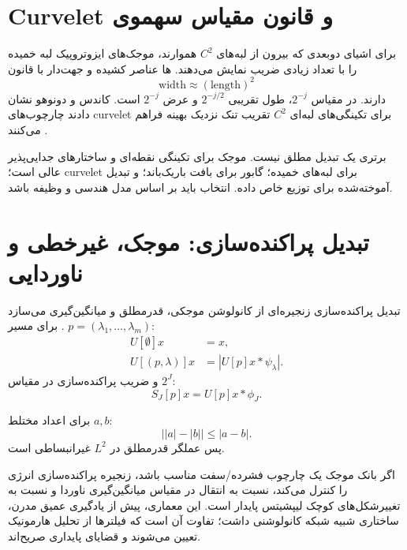\section{Curvelet و قانون مقیاس سهموی}

برای اشیای دوبعدی که بیرون از لبه‌های \(C^2\) هموارند، موجک‌های ایزوتروپیک لبه خمیده را با تعداد زیادی
ضریب نمایش می‌دهند. ها عناصر کشیده و جهت‌دار با قانون
\begin{equation}
\text{width}\approx(\text{length})^2
\end{equation}
دارند. در مقیاس \(2^{-j}\)، طول تقریبی \(2^{-j/2}\) و عرض \(2^{-j}\) است. کاندس و دونوهو نشان دادند
چارچوب‌های curvelet برای تکینگی‌های لبه‌ای \(C^2\) تقریب تنک نزدیک بهینه فراهم می‌کنند
\cite{candes2004curvelet}.

\begin{remark}
برتری یک تبدیل مطلق نیست. موجک برای تکینگی نقطه‌ای و ساختارهای جدایی‌پذیر عالی است؛ curvelet برای
لبه‌های خمیده؛ گابور برای بافت باریک‌باند؛ و تبدیل آموخته‌شده برای توزیع خاص داده. انتخاب باید بر اساس
مدل هندسی و وظیفه باشد.
\end{remark}

\section{تبدیل پراکنده‌سازی: موجک، غیرخطی و ناوردایی}

تبدیل پراکنده‌سازی  زنجیره‌ای از کانولوشن موجکی، قدرمطلق و میانگین‌گیری می‌سازد
\cite{mallat2012scattering}. برای مسیر \(p=(\lambda_1,\dots,\lambda_m)\):
\begin{equation}
\begin{aligned}
U[\emptyset]x&=x,\\
U[(p,\lambda)]x&=\left|U[p]x*\psi_{\lambda}\right|.
\end{aligned}
\end{equation}
و ضریب پراکنده‌سازی در مقیاس \(2^J\):
\begin{equation}
S_J[p]x=U[p]x*\phi_J.
\end{equation}

\begin{proposition}
برای اعداد مختلط \(a,b\):
\begin{equation}
\big||a|-|b|\big|\le|a-b|.
\end{equation}
پس عملگر قدرمطلق در \(L^2\) غیرانبساطی است.
\end{proposition}

اگر بانک موجک یک چارچوب فشرده/سفت مناسب باشد، زنجیره پراکنده‌سازی انرژی را کنترل می‌کند، نسبت به انتقال
در مقیاس میانگین‌گیری ناوردا و نسبت به تغییرشکل‌های کوچک لیپشیتس پایدار است. این معماری، پیش از یادگیری
عمیق مدرن، ساختاری شبیه شبکه کانولوشنی داشت؛ تفاوت آن است که فیلترها از تحلیل هارمونیک تعیین می‌شوند و
قضایای پایداری صریح‌اند.

